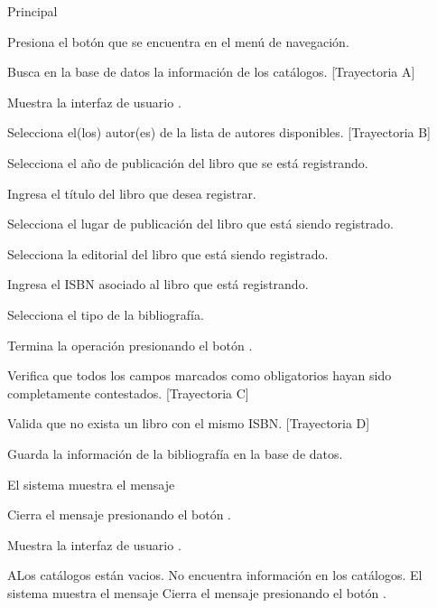 \begin{UCtrayectoria}{Principal}

    \UCpaso[\UCactor] Presiona el botón  que se encuentra en el menú de navegación.

    \UCpaso Busca en la base de datos la información de los catálogos. [Trayectoria A]

    \UCpaso Muestra la interfaz de usuario .

    \UCpaso[\UCactor] Selecciona el(los) autor(es) de la lista de autores disponibles. [Trayectoria B]

    \UCpaso[\UCactor] Selecciona el año de publicación del libro que se está registrando.

    \UCpaso[\UCactor] Ingresa el título del libro que desea registrar.

    \UCpaso[\UCactor] Selecciona el lugar de publicación del libro que está siendo registrado.

    \UCpaso[\UCactor] Selecciona la editorial del libro que está siendo registrado.

    \UCpaso[\UCactor] Ingresa el ISBN asociado al libro que está registrando.

    \UCpaso[\UCactor] Selecciona el tipo de la bibliografía.

    \UCpaso[\UCactor] Termina la operación presionando el botón .

    \UCpaso Verifica que todos los campos marcados como obligatorios hayan sido completamente contestados. [Trayectoria C]

    \UCpaso Valida que no exista un libro con el mismo ISBN. [Trayectoria D]

    \UCpaso Guarda la información de la bibliografía en la base de datos.

    \UCpaso El sistema muestra el mensaje 

    \UCpaso[\UCactor] Cierra el mensaje presionando el botón .

    \UCpaso Muestra la interfaz de usuario .
\end{UCtrayectoria}


\begin{UCtrayectoriaA}{A}{Los catálogos están vacios.}
    \UCpaso No encuentra información en los catálogos.
    \UCpaso El sistema muestra el mensaje 
    \UCpaso[\UCactor] Cierra el mensaje presionando el botón .
\end{UCtrayectoriaA}

